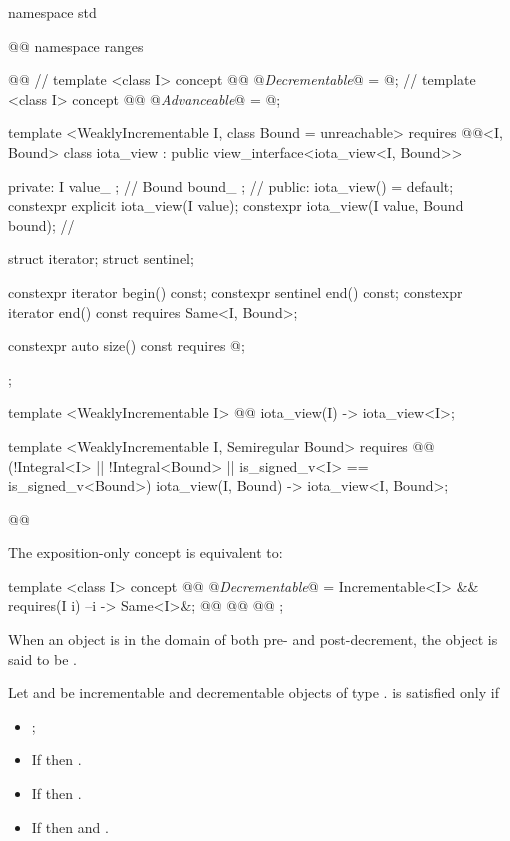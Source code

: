 \begin{codeblock}
namespace std { @@ namespace ranges { @@
  // \expos
  template <class I>
  concept @@ @\textit{Decrementable}@ = @\seebelow@;
  // \expos
  template <class I>
  concept @@ @\textit{Advanceable}@ = @\seebelow@;

  template <WeaklyIncrementable I, class Bound = unreachable>
    requires @@<I, Bound>
  class iota_view : public view_interface<iota_view<I, Bound>> {
  private:
    I value_ {}; // \expos
    Bound bound_ {}; // \expos
  public:
    iota_view() = default;
    constexpr explicit iota_view(I value);
    constexpr iota_view(I value, Bound bound); // \seebelow

    struct iterator;
    struct sentinel;

    constexpr iterator begin() const;
    constexpr sentinel end() const;
    constexpr iterator end() const requires Same<I, Bound>;

    constexpr auto size() const requires @\seebelow@;
  };

  template <WeaklyIncrementable I>
  @@ iota_view(I) -> iota_view<I>;

  template <WeaklyIncrementable I, Semiregular Bound>
    requires @@
      (!Integral<I> || !Integral<Bound> || is_signed_v<I> == is_signed_v<Bound>)
  iota_view(I, Bound) -> iota_view<I, Bound>;
}}@\removed{\}\}}@
\end{codeblock}

\pnum
The exposition-only  concept is equivalent to:
\begin{codeblock}
template <class I>
concept @@ @\textit{Decrementable}@ =
Incrementable<I> && requires(I i) {
  { --i } -> Same<I>&;
  @@
  @@
  @@
};
\end{codeblock}

\pnum
When an object is in the domain of both pre- and post-decrement,
the object is said to be .

\pnum
Let  and  be incrementable and decrementable objects of type
.  is satisfied only if
\begin{itemize}
\item {};
\item If  then .
\item If  then .
\item If  then  and
.
\end{itemize}

